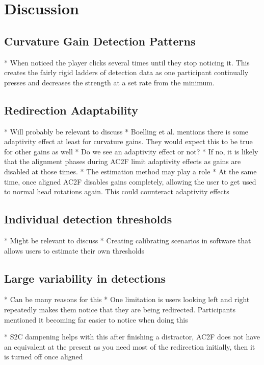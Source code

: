 \section{Discussion}


\subsection{Curvature Gain Detection Patterns}
* When noticed the player clicks several times until they stop noticing it. This creates the fairly rigid ladders of detection data as one participant continually presses and decreases the strength at a set rate from the minimum. 

\subsection{Redirection Adaptability}
* Will probably be relevant to discuss
* Boelling et al. mentions there is some adaptivity effect at least for curvature gains. They would expect this to be true for other gains as well
* Do we see an adaptivity effect or not?
   * If no, it is likely that the alignment phases during AC2F limit adaptivity effects as gains are disabled at those times.
* The estimation method may play a role
* At the same time, once aligned AC2F disables gains completely, allowing the user to get used to normal head rotations again. This could counteract adaptivity effects

\subsection{Individual detection thresholds}
* Might be relevant to discuss
* Creating calibrating scenarios in software that allows users to estimate their own thresholds

\subsection{Large variability in detections}
* Can be many reasons for this
* One limitation is users looking left and right repeatedly makes them notice that they are being redirected. Participants mentioned it becoming far easier to notice when doing this

* S2C dampening helps with this after finishing a distractor, AC2F does not have an equivalent at the present as you need most of the redirection initially, then it is turned off once aligned


